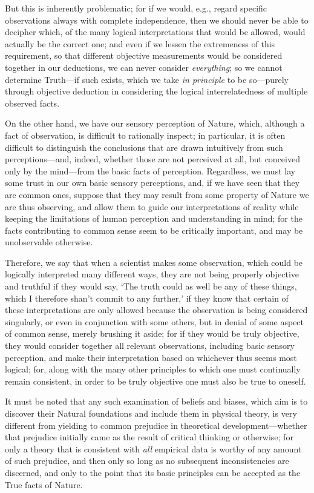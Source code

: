 But this is inherently problematic; for if we would, e.g., regard specific observations always with complete independence, then we should never be able to decipher which, of the many logical interpretations that would be allowed, would actually be the correct one; and even if we lessen the extremeness of this requirement, so that different objective measurements would be considered together in our deductions, we can never consider \textit{everything}; so we cannot determine Truth---if such exists, which we take \textit{in principle} to be so---purely through objective deduction in considering the logical interrelatedness of multiple observed facts. 

On the other hand, we have our sensory perception of Nature, which, although a fact of observation, is difficult to rationally inspect; in particular, it is often difficult to distinguish the conclusions that are drawn intuitively from such perceptions---and, indeed, whether those are not perceived at all, but conceived only by the mind---from the basic facts of perception. Regardless, we must lay some trust in our own basic sensory perceptions, and, if we have seen that they are common ones, suppose that they may result from some property of Nature we are thus observing, and allow them to guide our interpretations of reality while keeping the limitations of human perception and understanding in mind; for the facts contributing to common sense seem to be critically important, and may be unobservable otherwise. 

Therefore, we say that when a scientist makes some observation, which could be logically interpreted many different ways, they are not being properly objective and truthful if they would say, `The truth could as well be any of these things, which I therefore shan't commit to any further,' if they know that certain of these interpretations are only allowed because the observation is being considered singularly, or even in conjunction with some others, but in denial of some aspect of common sense, merely brushing it aside; for if they would be truly objective, they would consider together all relevant observations, including basic sensory perception, and make their interpretation based on whichever thus seems most logical; for, along with the many other principles to which one must continually remain consistent, in order to be truly objective one must also be true to oneself.

It must be noted that any such examination of beliefs and biases, which aim is to discover their Natural foundations and include them in physical theory, is very different from yielding to common prejudice in theoretical development---whether that prejudice initially came as the result of critical thinking or otherwise; for only a theory that is consistent with \textit{all} empirical data is worthy of any amount of such prejudice, and then only so long as no subsequent inconsistencies are discerned, and only to the point that its basic principles can be accepted as the True facts of Nature.

